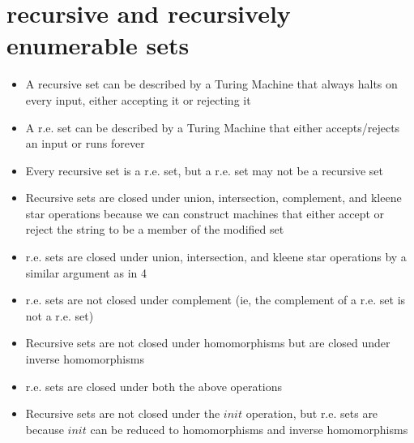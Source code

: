 \documentclass[11pt,letterpaper]{article}
\begin{document}
\section{recursive and recursively enumerable sets}
\begin{itemize}
    \item A recursive set can be described by a Turing Machine that always halts on every input, either accepting it or rejecting it
    \item A r.e. set can be described by a Turing Machine that either accepts/rejects an input or runs forever
    \item Every recursive set is a r.e. set, but a r.e. set may not be a recursive set
    \item Recursive sets are closed under union, intersection, complement, and kleene star operations because we can construct machines that either accept or reject the string to be a member of the modified set 
    \item r.e. sets are closed under union, intersection, and kleene star operations by a similar argument as in 4
    \item r.e. sets are not closed under complement (ie, the complement of a r.e. set is not a r.e. set)
    \item Recursive sets are not closed under homomorphisms but are closed under inverse homomorphisms
    \item r.e. sets are closed under both the above operations
    \item Recursive sets are not closed under the $init$ operation, but r.e. sets are because $init$ can be reduced to homomorphisms and inverse homomorphisms
\end{itemize}
\end{document}
